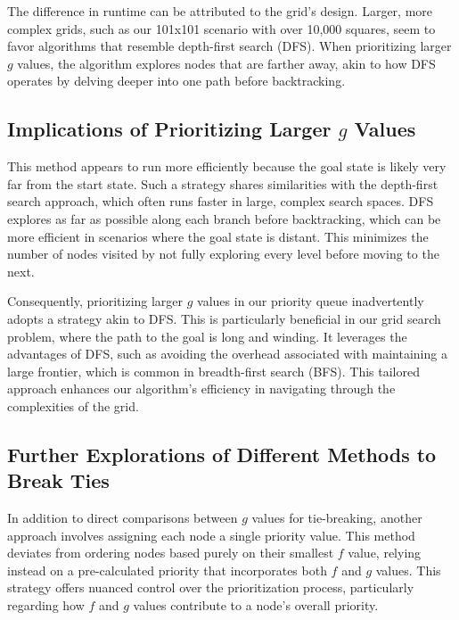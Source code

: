 \documentclass{article}
\begin{document}
The difference in runtime can be attributed to the grid's design. Larger, more complex grids, such as our 101x101 scenario with over 10,000 squares, seem to favor algorithms that resemble depth-first search (DFS). When prioritizing larger $g$ values, the algorithm explores nodes that are farther away, akin to how DFS operates by delving deeper into one path before backtracking.

\subsection{Implications of Prioritizing Larger $g$ Values}
This method appears to run more efficiently because the goal state is likely very far from the start state. Such a strategy shares similarities with the depth-first search approach, which often runs faster in large, complex search spaces. DFS explores as far as possible along each branch before backtracking, which can be more efficient in scenarios where the goal state is distant. This minimizes the number of nodes visited by not fully exploring every level before moving to the next.

Consequently, prioritizing larger $g$ values in our priority queue inadvertently adopts a strategy akin to DFS. This is particularly beneficial in our grid search problem, where the path to the goal is long and winding. It leverages the advantages of DFS, such as avoiding the overhead associated with maintaining a large frontier, which is common in breadth-first search (BFS). This tailored approach enhances our algorithm's efficiency in navigating through the complexities of the grid.

\subsection{Further Explorations of Different Methods to Break Ties}
In addition to direct comparisons between \(g\) values for tie-breaking, another approach involves assigning each node a single priority value. This method deviates from ordering nodes based purely on their smallest \(f\) value, relying instead on a pre-calculated priority that incorporates both \(f\) and \(g\) values. This strategy offers nuanced control over the prioritization process, particularly regarding how \(f\) and \(g\) values contribute to a node's overall priority.
\end{document}
